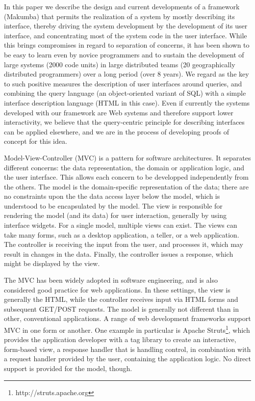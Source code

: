 \documentclass{chi2009}
\begin{document}
In this paper we describe the design and current developments of a framework (Makumba) that permits the realization of a system by mostly describing its interface, thereby driving the system development by the development of its user interface, and concentrating most of the system code in the user interface. While this brings compromises in regard to separation of concerns, it has been shown to be easy to learn even by novice programmers and to sustain the development of large systems (2000 code units) in large distributed teams (20 geographically distributed programmers) over a long period (over 8 years). We regard as the key to such positive measures the description of user interfaces around queries, and combining the query language (an object-oriented variant of SQL) with a simple interface description language (HTML in this case). Even if currently the systems developed with our framework are Web systems and therefore support lower interactivity, we believe that the query-centric principle for describing interfaces can be applied elsewhere, and we are in the process of developing proofs of concept for this idea.

Model-View-Controller (MVC) \cite{reenskaug1979mvc1} is a pattern for software architectures. It separates different concerns: the data representation, the domain or application logic, and the user interface. This allows each concern to be developped independently from the others.
The model is the domain-specific representation of the data; there are no constraints upon the the data access layer below the model, which is understood to be encapsulated by the model. The view is responsible for rendering the model (and its data) for user interaction, generally by using interface widgets. For a single model, multiple views can exist. The views can take many forms, such as a desktop application, a teller, or a web application.
The controller is receiving the input from the user, and processes it, which may result in changes in the data. Finally, the controller issues a response, which might be displayed by the view.

The MVC has been widely adopted in software engineering, and is also considered good practice for web applications. In these settings, the view is generally the HTML, while the controller receives input via HTML forms and subsequent GET/POST requests. The model is generally not different than in other, conventional applications. A range of web development frameworks support MVC in one form or another. One example in particular is Apache  Struts\footnote{http://struts.apache.org}, which provides the application developer with a tag library to create an interactive, form-based view, a response handler that is handling control, in combination with a request handler provided by the user, containing the application logic. No direct support is provided for the model, though.
\end{document}
